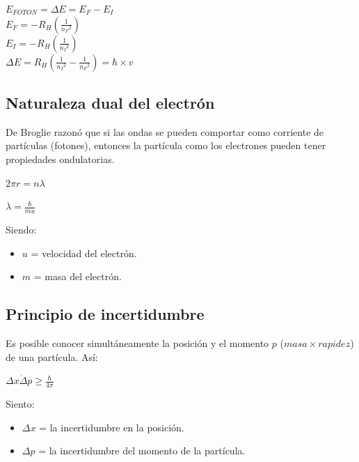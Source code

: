             \begin{center} 
                $E_{FOTON} = \Delta E = E_F - E_I$ \\[5pt]
                $E_F = - R_H (\frac{1}{{n_F}^{2}})$ \\[5pt]
                $E_I = -R_H (\frac{1}{{n_I}^{2}})$ \\[5pt]
                $\Delta E = R_H (\frac{1}{{n_I}^{2}} - \frac{1}{{n_F}^{2}}) = \hbar \times v$
            \end{center}
        
    \subsection{Naturaleza dual del electrón}
        \indent De Broglie razonó que si las ondas se pueden comportar como corriente de partículas (fotones), entonces la partícula como los electrones pueden tener propiedades ondulatorias. 
        \begin{center} $2 \pi r = n \lambda$ \end{center}
        \begin{center} $\lambda = \frac{\hbar}{mu}$ \end{center}        \indent Siendo:
        \begin{itemize} 
            \item $u$ = velocidad del electrón.
            \item $m$ = masa del electrón.
        \end{itemize}
    
    \subsection{Principio de incertidumbre}
        \indent Es posible conocer simultáneamente la posición y el momento $p$ ($ masa \times rapidez$) de una partícula. Así:
        \begin{center} $\Delta x \dot \Delta p \geq \frac{\hbar}{4\pi}$ \end{center}
        \indent Siento:
        \begin{itemize}
            \item $\Delta x$ = la incertidumbre en la posición.
            \item $\Delta p$ = la incertidumbre del momento de la partícula.
        \end{itemize}


